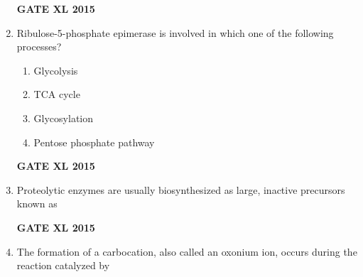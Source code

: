 \documentclass[journal,12pt,onecolumn]{IEEEtran}
\begin{document}
\begin{enumerate}
    \begin{enumerate}
    \end{enumerate}
\begin{flushright}\textbf{GATE XL 2015}\end{flushright}
\item Ribulose-5-phosphate epimerase is involved in which one of the following processes?
    \begin{enumerate}
            \item Glycolysis
	    \item TCA cycle
	    \item Glycosylation
            \item Pentose phosphate pathway
    \end{enumerate}
\begin{flushright}\textbf{GATE XL 2015}\end{flushright}
\item Proteolytic enzymes are usually biosynthesized as large, inactive precursors known as
    \begin{enumerate}
    \end{enumerate}
\begin{flushright}\textbf{GATE XL 2015}\end{flushright}
\item The formation of a carbocation, also called an oxonium ion, occurs during the reaction catalyzed by
    \begin{enumerate}
\end{enumerate}
\end{enumerate}
\end{document}
